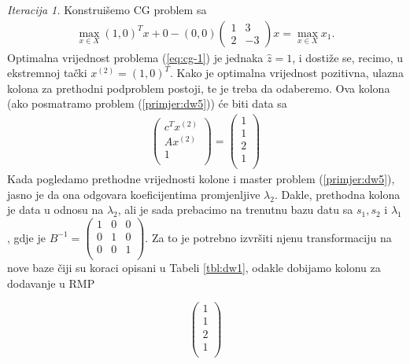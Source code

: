 \documentclass[b5paper, utf8, 11pt, colorlinks]{book}
\theoremstyle{definition}
\begin{document}
\emph{Iteracija 1.} 
Konstruišemo CG problem sa
\begin{align}\label{eq:cg-1}
	 \max_{x \in X} (1, 0)^T x + 0 - (0, 0) \left(\begin{array}{cc}
	 	1 & 3 \\
	 	2 & -3
	 \end{array}\right)  x = \max_{x \in X} x_1. 
\end{align} 
Optimalna vrijednost problema (\ref{eq:cg-1}) je jednaka $\hat{z}=1$, i dostiže se, recimo, u ekstremnoj tački $ x^{(2)}= (1, 0)^T.$ Kako je optimalna vrijednost pozitivna, ulazna kolona za prethodni podproblem postoji, te je treba da odaberemo. Ova kolona (ako posmatramo problem (\ref{primjer:dw5})) će biti data sa 
\begin{align}
     \begin{pmatrix}
     	    c^T  x^{(2)} \\
     	    A x^{(2)}  \\
     	    1     \\
     \end{pmatrix} = \begin{pmatrix}
               1 \\
               1  \\
               2  \\
               1\\
 \end{pmatrix}
\end{align}
Kada pogledamo prethodne vrijednosti kolone i master problem (\ref{primjer:dw5}), jasno je da ona odgovara koeficijentima promjenljive $\lambda_2$. Dakle, prethodna kolona je data u odnosu na $\lambda_2$, ali je sada prebacimo na trenutnu bazu datu sa $s_1, s_2$ i $\lambda_1$, gdje je $B^{-1} =  \begin{pmatrix}
	1 & 0 & 0 \\
	0 & 1 & 0  \\
	0 & 0 & 1  \\
\end{pmatrix}. $ %
Za to je potrebno izvršiti njenu transformaciju na nove baze čiji su koraci opisani u Tabeli \ref{tbl:dw1}, odakle dobijamo kolonu za dodavanje u RMP


$$	\begin{pmatrix}
	       1 \\
	      1  \\
	      2  \\
	      1\\
	\end{pmatrix}
 $$
 
\end{document}
